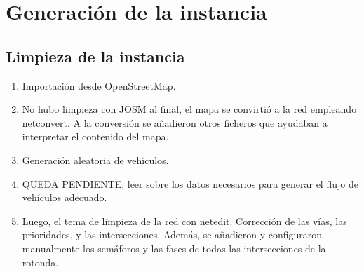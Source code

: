 \chapter{Generación de la instancia}
\label{cap:1-instancia}

\section{Limpieza de la instancia}

\begin{enumerate}
  \item Importación desde OpenStreetMap.

  \item No hubo limpieza con JOSM al final, el mapa se convirtió a la red empleando
        netconvert. A la conversión se añadieron otros ficheros que ayudaban a interpretar
        el contenido del mapa.

  \item Generación aleatoria de vehículos.
  \item QUEDA PENDIENTE: leer sobre los datos necesarios para generar el flujo de vehículos adecuado.
  \item Luego, el tema de limpieza de la red con netedit. Corrección de las vías, las prioridades, 
  y las intersecciones. Además, se añadieron y configuraron manualmente los semáforos y las fases de todas
  las intersecciones de la rotonda.

\end{enumerate}
